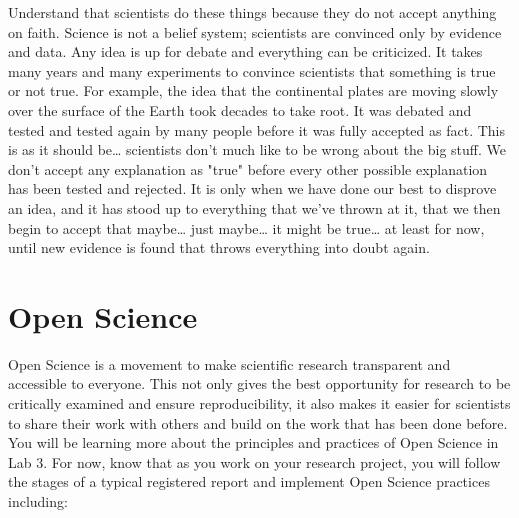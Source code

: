 \documentclass[
]{book}
\begin{document}
Understand that scientists do these things because they do not accept anything on faith. Science is not a belief system; scientists are convinced only by evidence and data. Any idea is up for debate and everything can be criticized. It takes many years and many experiments to convince scientists that something is true or not true. For example, the idea that the continental plates are moving slowly over the surface of the Earth took decades to take root. It was debated and tested and tested again by many people before it was fully accepted as fact. This is as it should be\ldots{} scientists don't much like to be wrong about the big stuff. We don't accept any explanation as "true" before every other possible explanation has been tested and rejected. It is only when we have done our best to disprove an idea, and it has stood up to everything that we've thrown at it, that we then begin to accept that maybe\ldots{} just maybe\ldots{} it might be true\ldots{} at least for now, until new evidence is found that throws everything into doubt again.

\hypertarget{open-science}{%
\section*{Open Science}\label{open-science}}

Open Science is a movement to make scientific research transparent and accessible to everyone. This not only gives the best opportunity for research to be critically examined and ensure reproducibility, it also makes it easier for scientists to share their work with others and build on the work that has been done before. You will be learning more about the principles and practices of Open Science in Lab 3. For now, know that as you work on your research project, you will follow the stages of a typical registered report and implement Open Science practices including:
\end{document}
